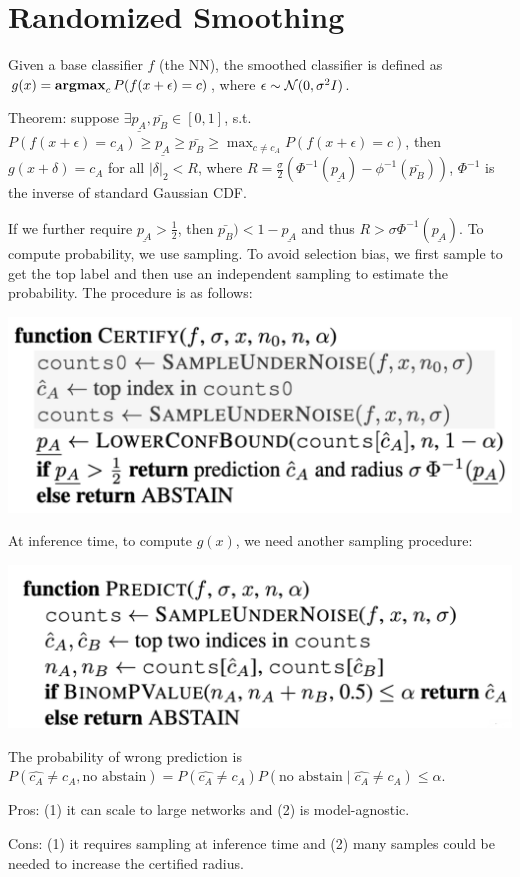 \section{Randomized Smoothing}

Given a base classifier $f$ (the NN), the smoothed classifier is defined as $g(x)=\operatorname{\textbf{argmax}}_c P(f(x+\epsilon)=c)$, where $\epsilon \sim \mathcal{N}(0,\sigma^2 I)$.

Theorem: suppose $\exists \underline{p_A}, \bar{p_B} \in [0,1]$, s.t. $P(f(x+\epsilon)=c_A) \ge \underline{p_A} \ge \bar{p_B} \ge \max_{c\ne c_A} P(f(x+\epsilon)=c)$, then $g(x+\delta)=c_A$ for all $|\delta|_2 <R$, where $R=\frac{\sigma}{2} (\Phi^{-1}(\underline{p_A})-\phi^{-1}(\bar{p_B}))$, $\Phi^{-1}$ is the inverse of standard Gaussian CDF.

If we further require $\underline{p_A}>\frac{1}{2}$, then $\bar{p_B})<1-\underline{p_A}$ and thus $R>\sigma \Phi^{-1}(\underline{p_A})$. To compute probability, we use sampling. To avoid selection bias, we first sample to get the top label and then use an independent sampling to estimate the probability. The procedure is as follows:

\includegraphics[width=\columnwidth]{img/rand_smooth.png}

At inference time, to compute $g(x)$, we need another sampling procedure:

\includegraphics[width=\columnwidth]{img/rand-predict.png}

The probability of wrong prediction is $P(\hat{c_A}\ne c_A, \text{no abstain}) = P(\hat{c_A}\ne c_A)P(\text{no abstain} \mid \hat{c_A}\ne c_A) \le \alpha$.

Pros: (1) it can scale to large networks and (2) is model-agnostic.

Cons: (1) it requires sampling at inference time and (2) many samples could be needed to increase the certified radius.